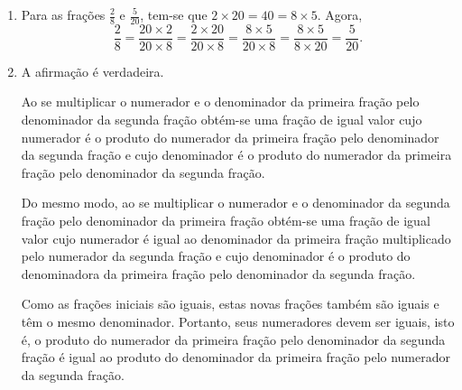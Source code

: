 \begin{multicols}{2}
\begin{orientacoes}{}{}



\end{orientacoes}{}{}

\end{multicols}

\begin{solucao}{}{}
\begin{enumerate} [\quad a)] %
    \item       Para as frações       $\frac{2}{8}$       e
$\frac{5}{20}$, tem-se que        $2 \times 20 = 40 = 8 \times 5$. Agora,
$$\frac{2}{8} = \frac{20 \times 2}{20 \times 8} = \frac{2 \times 20}{20 \times
8} = \frac{8 \times 5}{20 \times 8} = \frac{8 \times 5}{8 \times 20} =
\frac{5}{20}.$$
    \item       A afirmação é verdadeira.

  Ao se multiplicar o numerador e o denominador da primeira fração pelo
denominador da segunda fração obtém-se uma fração de igual valor cujo numerador
é o produto do numerador da primeira fração pelo denominador da segunda fração e
cujo denominador é o produto do numerador da primeira fração pelo denominador da
segunda fração.

  Do mesmo modo, ao se multiplicar o numerador e o denominador da segunda fração
pelo denominador da primeira fração obtém-se uma fração de igual valor cujo
numerador é igual ao denominador da primeira fração multiplicado pelo numerador
da segunda fração e cujo denominador é o produto do denominadora da primeira
fração pelo denominador da segunda fração.

  Como as frações iniciais são iguais, estas novas frações também são iguais e
têm o mesmo denominador. Portanto, seus numeradores devem ser iguais, isto é, o
produto do numerador da primeira fração pelo denominador da segunda fração é
igual ao produto do denominador da primeira fração pelo numerador da segunda
fração.
\end{enumerate} %

  \end{solucao}



